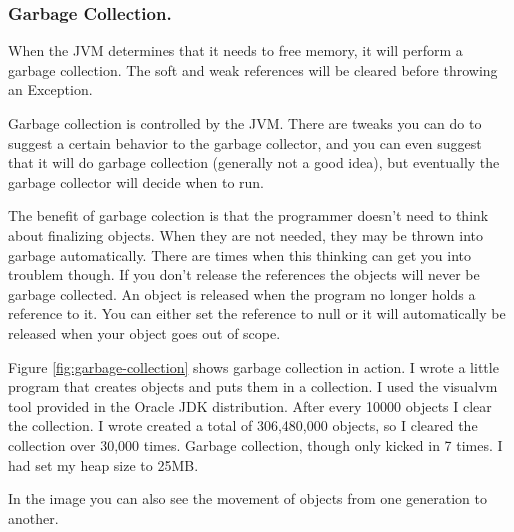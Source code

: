 \subsubsection{Garbage Collection.}
When the JVM determines that it needs to free memory, it will perform a garbage collection. The soft and weak references will be cleared before throwing an Exception. 

Garbage collection is controlled by the JVM. There are tweaks you can do to suggest a certain behavior to the garbage collector, and you can even suggest that it will do garbage collection (generally not a good idea), but eventually the garbage collector will decide when to run.

The benefit of garbage colection is that the programmer doesn't need to think about finalizing objects. When they are not needed, they may be thrown into garbage automatically. There are times when this thinking can get you into troublem though. If you don't release the references the objects will never be garbage collected. An object is released when the program no longer holds a reference to it. You can either set the reference to null or it will automatically be released when your object goes out of scope.

Figure \ref{fig:garbage-collection} shows garbage collection in action. I wrote a little program that creates objects and puts them in a collection. I used the visualvm tool provided in the Oracle JDK distribution\cite{garbagecollection}. After every 10000 objects I clear the collection. I wrote created a total of 306,480,000 objects, so I cleared the collection over 30,000 times. Garbage collection, though only kicked in 7 times. I had set my heap size to 25MB. 

In the image you can also see the movement of objects from one generation to another.
